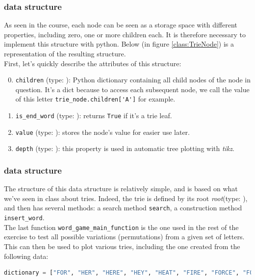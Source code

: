 \documentclass[10pt,a4paper,hidelinks]{article}
\begin{document}
\subsubsection{ data structure}

As seen in the course, each node can be seen as a storage space with different properties, including zero, one or more children each. It is therefore necessary to implement this structure with python. Below (in figure \ref{class:TrieNode}) is a representation of the resulting structure.\\

First, let's quickly describe the attributes of this structure:
\begin{enumerate}
    \setcounter{enumi}{-1}
    \item \verb|children| (type: ): Python dictionary containing all child nodes of the node in question. It's a dict because to access each subsequent node, we call the value of this letter \verb|trie_node.children['A']| for example.
    \item \verb|is_end_word| (type: ): returns \verb|True| if it's a trie leaf.
    \item \verb|value| (type: ): stores the node's value for easier use later.
    \item \verb|depth| (type: ): this property is used in automatic tree plotting with \textit{tikz}.
\end{enumerate}

\subsubsection{ data structure}

The structure of this data structure is relatively simple, and is based on what we've seen in class about tries. Indeed, the trie is defined by its root \textit{root}(type: ), and then has several methods: a search method \verb|search|, a construction method \verb|insert_word|.\\
The last function \verb|word_game_main_function| is the one used in the rest of the exercise to test all possible variations (permutations) from a given set of letters.\\

This can then be used to plot various tries, including the one created from the following data:
\begin{lstlisting}[language=Python, caption=Sample data to create trie]
dictionary = ["FOR", "HER", "HERE", "HEY", "HEAT", "FIRE", "FORCE", "FORWARD", "FORWARDER", "FIRM", "FIRSTLY", "FIRSTS", "FIREWORK", "HEIGHTY", "HEIGHTEEN", "FIREWALL"]
\end{lstlisting}
\small{}
\end{document}
